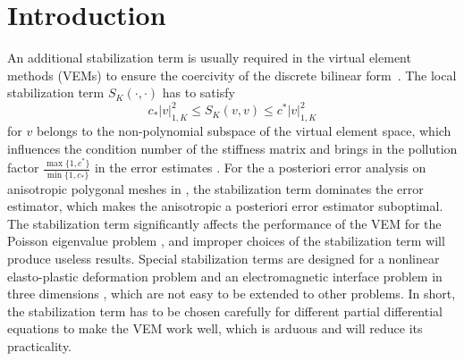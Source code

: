 \documentclass[10pt]{amsart}
\numberwithin{equation}{section}
\begin{document}

\maketitle


\section{Introduction}
An additional stabilization term is usually required in the virtual element methods (VEMs) to ensure the coercivity of the discrete bilinear form~\cite{BeiraoBrezziCangianiManziniEtAl2013,BeiraoBrezziMariniRusso2014}.
The local stabilization term $S_K(\cdot, \cdot)$ has to satisfy 
$$
c_{*} |v|_{1,K}^2\leq S_K(v,v)\leq c^{*} |v|_{1,K}^2 
$$
for $v$ belongs to the non-polynomial subspace of the virtual element space, which influences the condition number of the stiffness matrix and brings in the pollution factor $\frac{\max\{1, c^*\}}{\min\{1, c_*\}}$ in the error estimates \cite{DassiMascotto2018,BeiraodaVeigaDassiRusso2017,Mascotto2018}.  
For the a posteriori error analysis on anisotropic polygonal meshes in \cite{AntoniettiBerroneBorioDAuriaEtAl2022}, the stabilization term dominates the error estimator, which makes the anisotropic a posteriori error estimator suboptimal. 
The stabilization term significantly affects the performance of the VEM for the Poisson eigenvalue problem \cite{BoffiGardiniGastaldi2020},
and improper choices of the stabilization term will produce useless results.
Special stabilization terms are designed for a nonlinear elasto-plastic deformation problem \cite{HudobivnikAldakheelWriggers2019} and an electromagnetic interface problem in three dimensions \cite{CaoChenGuo2023}, which are not easy to be extended to other problems. 
In short, the stabilization term has to be chosen carefully for different partial differential equations to make the VEM work well, which is arduous and will reduce its practicality.
\end{document}
